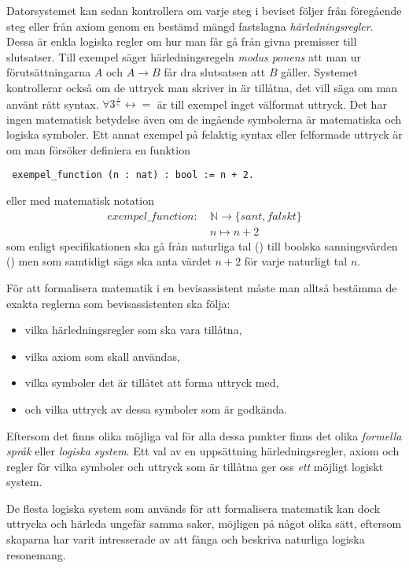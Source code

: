 Datorsystemet kan sedan kontrollera om varje steg i beviset följer från
föregående steg eller från axiom genom en bestämd mängd fastslagna
\emph{härledningsregler}. Dessa är enkla logiska regler om hur man får gå från
givna premisser till slutsatser. Till exempel säger härledningsregeln
\emph{modus ponens} att man ur förutsättningarna $A$ och $A \to B$ får dra
slutsatsen att $B$ gäller. Systemet kontrollerar också om de uttryck man
skriver in är tillåtna, det vill säga om man använt rätt syntax.
$\forall 3^{\frac{+}{\in}} \leftrightarrow =$ är till exempel inget välformat
uttryck. Det har ingen matematisk betydelse även om de ingående symbolerna är
matematiska och logiska symboler. Ett annat exempel på felaktig syntax eller
felformade uttryck är om man försöker definiera en funktion
\begin{lstlisting}
 exempel_function (n : nat) : bool := n + 2.
\end{lstlisting}
eller med matematisk notation
\begin{align*}
  exempel\_function :\ &\mathbb{N} \to \{sant, falskt\} \\
                       &n \mapsto n + 2
\end{align*}
som enligt specifikationen ska gå från naturliga tal () till boolska
sanningsvärden () men som samtidigt sägs ska anta värdet $n + 2$ för
varje naturligt tal $n$.

För att formalisera matematik i en bevisassistent måste man alltså bestämma de
exakta reglerna som bevisassistenten ska följa:
\begin{itemize}
  \item vilka härledningsregler som ska vara tillåtna,
  \item vilka axiom som skall användas,
  \item vilka symboler det är tillåtet att forma uttryck med,
  \item och vilka uttryck av dessa symboler som är godkända.
\end{itemize}
Eftersom det finns olika möjliga val för alla dessa punkter finns det olika
\emph{formella språk} eller \emph{logiska system}. Ett val av en uppsättning
härledningsregler, axiom och regler för vilka symboler och uttryck som är
tillåtna ger oss \emph{ett} möjligt logiskt system.

De flesta logiska system som används för att formalisera matematik kan dock
uttrycka och härleda ungefär samma saker, möjligen på något olika sätt,
eftersom skaparna har varit intresserade av att fånga och beskriva naturliga
logiska resonemang.

